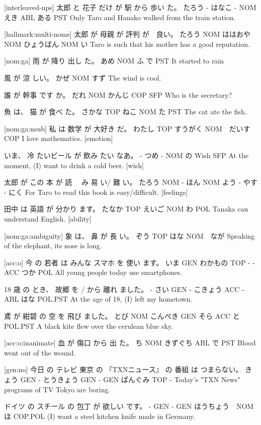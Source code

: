 [interleaved-nps]
太郎  と 花子  だけ が  駅  から 歩い  た。
たろう - はなこ -  NOM えき ABL ある  PST
Only Taro and Hanako walked from the train station.

[hallmark:multi-noms]
太郎  が   母親    が   評判      が　良い。
たろう NOM ははおや NOM ひょうばん NOM い
Taro is such that his mother has a good reputation.

[nom:ga]
雨  が   降り 出し た。
あめ NOM ふ   で PST
It started to rain

風  が   涼 しい。
かぜ NOM すず
The wind is cool.

誰  が   幹事   です か。
だれ NOM かんじ  COP SFP
Who is the secretary?

魚    は、 猫   が  食べ た。
さかな TOP ねこ NOM た  PST
The cat ate the fish.

[nom:ga:nsub]
私    は   数学    が   大好き だ。
わたし TOP すうがく NOM　だいす COP
I love mathematics. [emotion]

いま、 冷  たいビール が  飲み たい なあ。
-    つめ -       NOM  の  Wish SFP
At the moment, (I) want to drink a cold beer. [wish]

太郎   が この 本   が  読 　み 易 い/ 難 い。
たろう NOM -  ほん NOM よう - やす - にく
For Taro to read this book is easy/difficult. [feelings]

田中   は  英語   が  分かり ます。
たなか TOP えいご NOM わ     POL
Tanaka can understand English. [ability]

[nom:ga:ambiguity]
象   は、 鼻  が   長 い。
ぞう TOP はな NOM　なが
Speaking of the elephant, its nose is long.

[acc:o]
今   の  若者    は  みんな スマホ を  使い ます。
いま GEN わかもの TOP -    -     ACC つか POL
All young people today use smartphones.

18 歳  の とき、 故郷    を   / から 離れ ました。
- さい GEN -    こきょう ACC - ABL はな POL.PST
At the age of 18, (I) left my hometown.

鳶   が  紺碧     の  空  を  飛び ました。
とび NOM こんぺき GEN そら ACC と   POL.PST
A black kite flew over the cerulean blue sky.

[acc:o:inanimate]
血 が   傷口   から 出 た。
ち NOM きずぐち ABL で PST
Blood went out of the wound.

[gen:no]
今日   の  テレビ 東京  の 『TXNニュース』 の  番組   は  つまらない。
きょう GEN - とうきょう GEN -        GEN ばんぐみ TOP -
Today's "TXN News" programs of TV Tokyo are boring.

ドイツ の スチール の 包丁   が      欲しい です。
-    GEN -     GEN ほうちょう　NOM ほ   COP.POL
(I) want a steel kitchen knife made in Germany.

